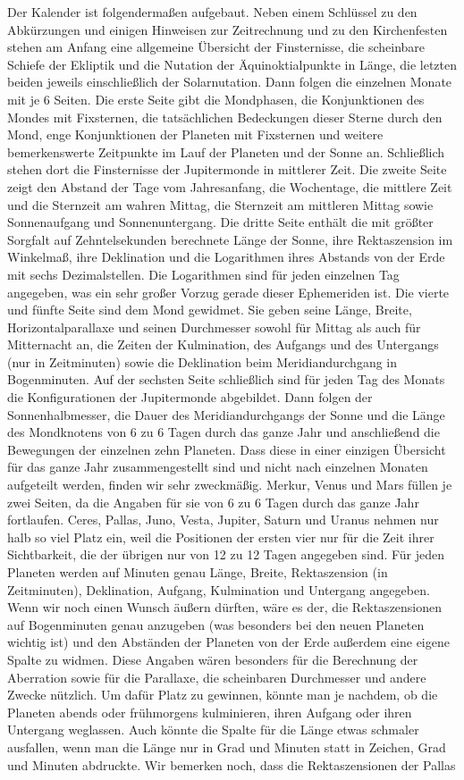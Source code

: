 Der Kalender ist folgendermaßen aufgebaut. Neben einem Schlüssel zu den Abkürzungen und einigen Hinweisen zur Zeitrechnung und zu den Kirchenfesten stehen am Anfang eine allgemeine Übersicht der Finsternisse, die scheinbare Schiefe der Ekliptik und die Nutation der Äquinoktialpunkte in Länge, die letzten beiden jeweils einschließlich der Solarnutation. Dann folgen die einzelnen Monate mit je 6 Seiten. Die erste Seite gibt die Mondphasen, die Konjunktionen des Mondes mit Fixsternen, die tatsächlichen Bedeckungen dieser Sterne durch den Mond, enge Konjunktionen der Planeten mit Fixsternen und weitere bemerkenswerte Zeitpunkte im Lauf der Planeten und der Sonne an. Schließlich stehen dort die Finsternisse der Jupitermonde in mittlerer Zeit. Die zweite Seite zeigt den Abstand der Tage vom Jahresanfang, die Wochentage, die mittlere Zeit und die Sternzeit am wahren Mittag, die Sternzeit am mittleren Mittag sowie Sonnenaufgang und Sonnenuntergang. Die dritte Seite enthält die mit größter Sorgfalt auf Zehntelsekunden berechnete Länge der Sonne, ihre Rektaszension im Winkelmaß, ihre Deklination und die Logarithmen ihres Abstands von der Erde mit sechs Dezimalstellen. Die Logarithmen sind für jeden einzelnen Tag angegeben, was ein sehr großer Vorzug gerade dieser Ephemeriden ist. Die vierte und fünfte Seite sind dem Mond gewidmet. Sie geben seine Länge, Breite, Horizontalparallaxe und seinen Durchmesser sowohl für Mittag als auch für Mitternacht an, die Zeiten der Kulmination, des Aufgangs und des Untergangs (nur in Zeitminuten) sowie die Deklination beim Meridiandurchgang in Bogenminuten. Auf der sechsten Seite schließlich sind für jeden Tag des Monats die Konfigurationen der Jupitermonde abgebildet. Dann folgen der Sonnenhalbmesser, die Dauer des Meridiandurchgangs der Sonne und die Länge des Mondknotens von 6 zu 6 Tagen durch das ganze Jahr und anschließend die Bewegungen der einzelnen zehn Planeten. Dass diese in einer einzigen Übersicht für das ganze Jahr zusammengestellt sind und nicht nach einzelnen Monaten aufgeteilt werden, finden wir sehr zweckmäßig. Merkur, Venus und Mars füllen je zwei Seiten, da die Angaben für sie von 6 zu 6 Tagen durch das ganze Jahr fortlaufen. Ceres, Pallas, Juno, Vesta, Jupiter, Saturn und Uranus nehmen nur halb so viel Platz ein, weil die Positionen der ersten vier nur für die Zeit ihrer Sichtbarkeit, die der übrigen nur von 12 zu 12 Tagen angegeben sind. Für jeden Planeten werden auf Minuten genau Länge, Breite, Rektaszension (in Zeitminuten), Deklination, Aufgang, Kulmination und Untergang angegeben. Wenn wir noch einen Wunsch äußern dürften, wäre es der, die Rektaszensionen auf Bogenminuten genau anzugeben (was besonders bei den neuen Planeten wichtig ist) und den Abständen der Planeten von der Erde außerdem eine eigene Spalte zu widmen. Diese Angaben wären besonders für die Berechnung der Aberration sowie für die Parallaxe, die scheinbaren Durchmesser und andere Zwecke nützlich. Um dafür Platz zu gewinnen, könnte man je nachdem, ob die Planeten abends oder frühmorgens kulminieren, ihren Aufgang oder ihren Untergang weglassen. Auch könnte die Spalte für die Länge etwas schmaler ausfallen, wenn man die Länge nur in Grad und Minuten statt in Zeichen, Grad und Minuten abdruckte. Wir bemerken noch, dass die Rektaszensionen der Pallas 